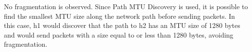 No fragmentation is observed. Since Path MTU Discovery is used, it is possible to find the smallest MTU size along the network path before sending packets. In this case, h1 would discover that the path to h2 has an MTU size of 1280 bytes and would send packets with a size equal to or less than 1280 bytes, avoiding fragmentation.